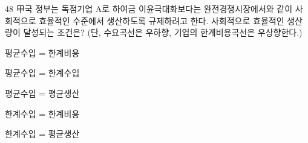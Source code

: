 \begin{question}{48}
甲국 정부는 독점기업 A로 하여금 이윤극대화보다는 완전경쟁시장에서와 같이 사회적으로 효율적인 수준에서 생산하도록 규제하려고 한다. 사회적으로 효율적인 생산량이 달성되는 조건은? (단, 수요곡선은 우하향, 기업의 한계비용곡선은 우상향한다.)
\begin{choices}
  \item 평균수입 = 한계비용
  \item 평균수입 = 한계수입
  \item 평균수입 = 평균생산
  \item 한계수입 = 한계비용
  \item 한계수입 = 평균생산
\end{choices}
\end{question}
